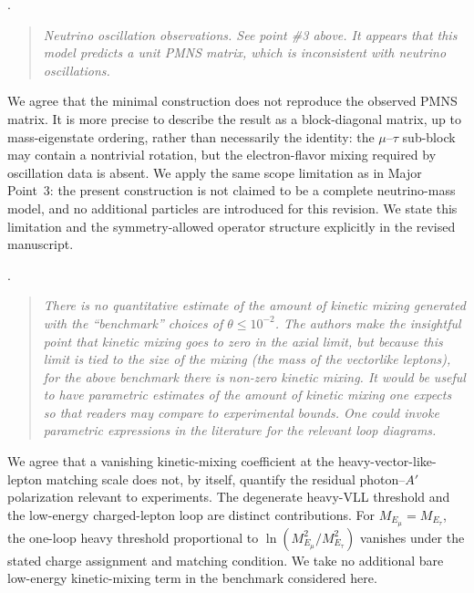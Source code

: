 \documentclass[12pt,a4paper]{article}
\begin{document}
\medskip
{}.
\begin{quote}\itshape
Neutrino oscillation observations. See point \#3 above. It appears that this model predicts a unit PMNS matrix, which is inconsistent with neutrino oscillations.
\end{quote}


We agree that the minimal construction does not reproduce the observed PMNS matrix. It is more precise to describe the result as a block-diagonal matrix, up to mass-eigenstate ordering, rather than necessarily the identity: the \(\mu\)--\(\tau\) sub-block may contain a nontrivial rotation, but the electron-flavor mixing required by oscillation data is absent. We apply the same scope limitation as in Major Point~3: the present construction is not claimed to be a complete neutrino-mass model, and no additional particles are introduced for this revision. We state this limitation and the symmetry-allowed operator structure explicitly in the revised manuscript.

\medskip
{}.
\begin{quote}\itshape
There is no quantitative estimate of the amount of kinetic mixing generated with the ``benchmark'' choices of \(\theta\leq10^{-2}\). The authors make the insightful point that kinetic mixing goes to zero in the axial limit, but because this limit is tied to the size of the mixing (the mass of the vectorlike leptons), for the above benchmark there is non-zero kinetic mixing. It would be useful to have parametric estimates of the amount of kinetic mixing one expects so that readers may compare to experimental bounds. One could invoke parametric expressions in the literature for the relevant loop diagrams.
\end{quote}


We agree that a vanishing kinetic-mixing coefficient at the heavy-vector-like-lepton matching scale does not, by itself, quantify the residual photon--\(A'\) polarization relevant to experiments. The degenerate heavy-VLL threshold and the low-energy charged-lepton loop are distinct contributions. For \(M_{E_\mu}=M_{E_\tau}\), the one-loop heavy threshold proportional to \(\ln(M_{E_\mu}^2/M_{E_\tau}^2)\) vanishes under the stated charge assignment and matching condition. We take no additional bare low-energy kinetic-mixing term in the benchmark considered here.
\end{document}
